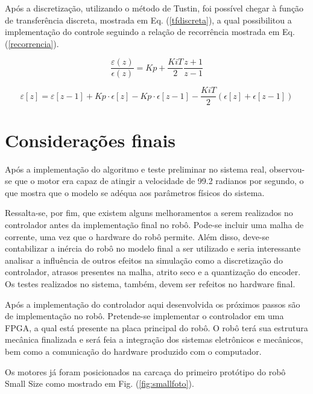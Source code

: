 \documentclass[10pt,fleqn,a4paper]{article}
\begin{document}
    Após a discretização, utilizando o método de Tustin, foi possível chegar à função de transferência discreta, mostrada em Eq. (\ref{tfdiscreta}), a qual possibilitou a implementação do controle seguindo a relação de recorrência mostrada em Eq. (\ref{recorrencia}).
    
    \begin{equation}
    \frac{\varepsilon(z)}{\epsilon(z)}= Kp + \frac{Ki T}{2}\frac{z+1}{z-1} \label{tfdiscreta}
    \end{equation}
    
    \begin{equation}
    \varepsilon[z] = \varepsilon[z-1] + Kp\cdot\epsilon[z] - Kp\cdot\epsilon[z-1] - \frac{Ki T}{2}(\epsilon[z] + \epsilon[z-1]) \label{recorrencia}
    \end{equation}
    
    \newpage
    
    \section{Considerações finais}
    
    Após a implementação do algoritmo e teste preliminar no sistema real, observou-se que o motor era capaz de atingir a velocidade de 99.2 radianos por segundo, o que mostra que o modelo se adéqua aos parâmetros físicos do sistema.
    
    Ressalta-se, por fim, que existem alguns melhoramentos a serem realizados no controlador antes da implementação final no robô. Pode-se incluir uma malha de corrente, uma vez que o hardware do robô permite. Além disso, deve-se contabilizar a inércia do robô no modelo final a ser utilizado e seria interessante analisar a influência de outros efeitos na simulação como a discretização do controlador, atrasos presentes na malha, atrito seco e a quantização do encoder. Os testes realizados no sistema, também, devem ser refeitos no hardware final.
    
    Após a implementação do controlador aqui desenvolvida os próximos passos são de implementação no robô. Pretende-se implementar o controlador em uma FPGA, a qual está presente na placa principal do robô. O robô terá sua estrutura mecânica finalizada e será feia a integração dos sistemas eletrônicos e mecânicos, bem como a comunicação do hardware produzido com o computador.
 
    
    Os motores já foram posicionados na carcaça do primeiro protótipo do robô Small Size como mostrado em Fig. (\ref{fig:smallfoto}).
\end{document}
